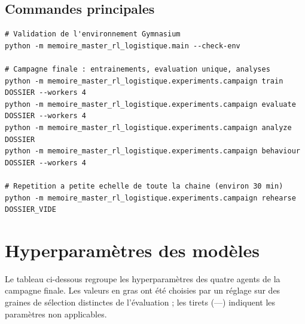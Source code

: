 \documentclass[11pt,a4paper]{report}
\begin{document}
\section*{Commandes principales}

\begin{lstlisting}
# Validation de l'environnement Gymnasium
python -m memoire_master_rl_logistique.main --check-env

# Campagne finale : entrainements, evaluation unique, analyses
python -m memoire_master_rl_logistique.experiments.campaign train     DOSSIER --workers 4
python -m memoire_master_rl_logistique.experiments.campaign evaluate  DOSSIER --workers 4
python -m memoire_master_rl_logistique.experiments.campaign analyze   DOSSIER
python -m memoire_master_rl_logistique.experiments.campaign behaviour DOSSIER --workers 4

# Repetition a petite echelle de toute la chaine (environ 30 min)
python -m memoire_master_rl_logistique.experiments.campaign rehearse  DOSSIER_VIDE
\end{lstlisting}

\chapter{Hyperparamètres des modèles}
\label{ann:hyperparametres}

Le tableau ci-dessous regroupe les hyperparam\`etres des quatre agents de la campagne finale. Les valeurs en gras ont \'et\'e choisies par un r\'eglage sur des graines de s\'election distinctes de l'\'evaluation ; les tirets (---) indiquent les param\`etres non applicables.
\end{document}

